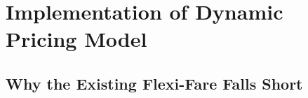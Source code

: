 \documentclass[10pt,a4paper]{article}
\begin{document}




\section{Implementation of Dynamic Pricing Model}

\subsection{Why the Existing Flexi-Fare Falls Short}
 
\end{document}
